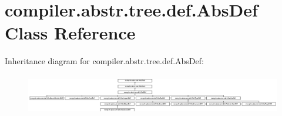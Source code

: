 \hypertarget{classcompiler_1_1abstr_1_1tree_1_1def_1_1_abs_def}{}\section{compiler.\+abstr.\+tree.\+def.\+Abs\+Def Class Reference}
\label{classcompiler_1_1abstr_1_1tree_1_1def_1_1_abs_def}
Inheritance diagram for compiler.\+abstr.\+tree.\+def.\+Abs\+Def\+:\begin{figure}[H]
\begin{center}
\leavevmode
\includegraphics[height=1.771218cm]{classcompiler_1_1abstr_1_1tree_1_1def_1_1_abs_def}
\end{center}
\end{figure}
